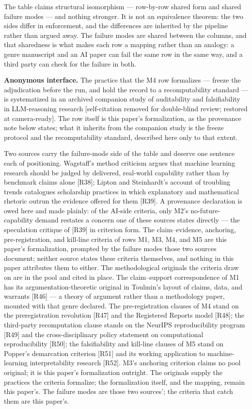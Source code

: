 \documentclass[11pt,a4paper]{article}
\begin{document}
The table claims structural isomorphism — row-by-row shared form and shared failure modes — and nothing stronger. It is not an equivalence theorem: the two sides differ in enforcement, and the differences are inherited by the pipeline rather than argued away. The failure modes are shared between the columns, and that sharedness is what makes each row a mapping rather than an analogy: a genre manuscript and an AI paper can fail the same row in the same way, and a third party can check for the failure in both.

\textbf{Anonymous interface.} The practice that the M4 row formalizes — freeze the adjudication before the run, and hold the record to a recomputability standard — is systematized in an archived companion study of auditability and falsifiability in LLM-reasoning research [self-citation removed for double-blind review; restored at camera-ready]. The row itself is this paper's formalization, as the provenance note below states; what it inherits from the companion study is the freeze protocol and the recomputability standard, described here only to that extent.

Two sources carry the failure-mode side of the table and deserve one sentence each of positioning. Wagstaff's method criticism argues that machine learning research should be judged by delivered, real-world capability rather than by benchmark claims alone [R38]; Lipton and Steinhardt's account of troubling trends catalogues scholarship practices in which explanatory and mathematical rhetoric outrun the evidence offered for them [R39]. A provenance declaration is owed here and made plainly: of the AI-side criteria, only M2's no-future-capability demand restates a concern one of these sources states directly — the speculation critique of [R39] in criterion form. The claim–evidence, anchoring, pre-registration, and kill-line criteria of rows M1, M3, M4, and M5 are this paper's formalization, prompted by the failure modes those two sources document; neither source states these criteria themselves, and nothing in this paper attributes them to either. The methodological originals the criteria draw on are in the pool and cited in place. The claim–support correspondence of M1 has its argumentation-theoretic original in Toulmin's layout of claims, data, and warrants [R46] — a theory of argument rather than a methodology paper, mounted with that genre declared. The pre-registration clauses of M4 stand on the preregistration revolution [R47] and the Registered Reports model [R48]; the third-party recomputation clause stands on the NeurIPS reproducibility program [R49] and the cross-disciplinary policy statement on computational reproducibility [R50]; the falsifiability and kill-line clauses of M5 stand on Popper's demarcation criterion [R51] and its working application to machine-learning interpretability research [R52]. M3's anchoring criterion claims no pool original; it is this paper's formalization outright. The originals supply the practices the criteria formalize; the formalization itself, and the mapping, remain this paper's. The failure modes are those two sources'; the criteria that catch them are this paper's.
\end{document}

